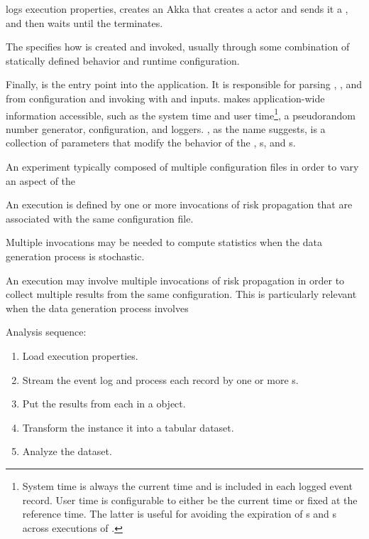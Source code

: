  logs execution properties, creates an Akka  that creates a  actor and sends it a , and then waits until the  terminates.

The  specifies how  is created and invoked, usually through some combination of statically defined behavior and runtime configuration.

Finally,  is the entry point into the application. It is responsible for parsing , , and  from configuration and invoking  with  and  inputs.  makes  application-wide information accessible, such as the system time and user time\footnote{System time is always the current time and is included in each logged event record. User time is configurable to either be the current time or fixed at the reference time. The latter is useful for avoiding the expiration of s and s across executions of .}, a pseudorandom number generator,  configuration, and loggers. , as the name suggests, is a collection of parameters that modify the behavior of the , s, and s.

An experiment typically composed of multiple configuration files in order to vary an aspect of the 

An execution is defined by one or more invocations of risk propagation that are associated with the same configuration file. 

Multiple invocations may be needed to compute statistics when the data generation process is stochastic.

An execution may involve multiple invocations of risk propagation in order to collect multiple results from the same configuration. This is particularly relevant when the data generation process involves 

Analysis sequence:

\begin{enumerate}
  \item Load execution properties.
  \item Stream the event log and process each record by one or more s.
  \item Put the results from each  in a  object.
  \item Transform the  instance it into a tabular dataset.
  \item Analyze the dataset.
\end{enumerate}

